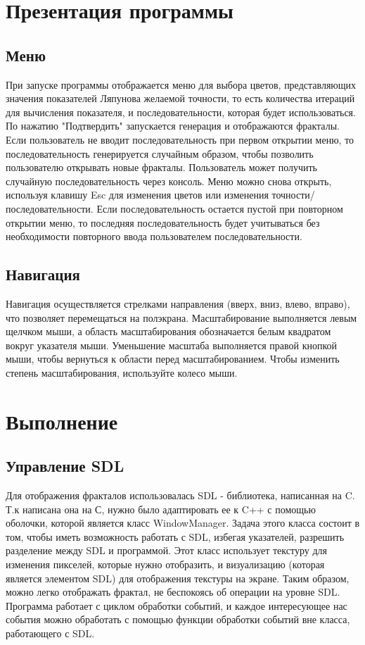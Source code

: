 \documentclass[a5paper,10pt, twoside]{article} %
\begin{document}
\section{Презентация программы}

  \subsection{Меню}

  При запуске программы отображается меню для выбора цветов, представляющих значения показателей Ляпунова
  желаемой точности, то есть количества итераций для вычисления показателя, и последовательности, которая будет использоваться.
  По нажатию "Подтвердить" запускается генерация и отображаются фракталы.
  Если пользователь не вводит последовательность при первом открытии меню, то последовательность генерируется случайным образом, 
  чтобы позволить пользователю открывать новые фракталы.
  Пользователь может получить случайную последовательность через консоль.
  Меню можно снова открыть, используя клавишу Esc для изменения цветов или изменения точности/последовательности.
  Если последовательность остается пустой при повторном открытии меню, то последняя последовательность будет учитываться 
  без необходимости повторного ввода пользователем последовательности.

  \subsection{Навигация}

  Навигация осуществляется стрелками направления (вверх, вниз, влево, вправо), что позволяет перемещаться на полэкрана.
  Масштабирование выполняется левым щелчком мыши, а область масштабирования обозначается белым квадратом вокруг указателя мыши.
  Уменьшение масштаба выполняется правой кнопкой мыши, чтобы вернуться к области перед масштабированием.
  Чтобы изменить степень масштабирования, используйте колесо мыши.

\section{Выполнение}
  
  \subsection{Управление SDL}

  Для отображения фракталов использовалась SDL - библиотека, написанная на C. Т.к написана она на С, нужно было 
  адаптировать ее к C++ с помощью оболочки, которой является класс WindowManager.
  Задача этого класса состоит в том, чтобы иметь возможность работать с SDL, избегая указателей,
   разрешить разделение между SDL и программой.
  Этот класс использует текстуру для изменения пикселей, которые нужно отобразить, и визуализацию 
  (которая является элементом SDL) для отображения текстуры на экране.
  Таким образом, можно легко отображать фрактал, не беспокоясь об операции на уровне SDL.
  Программа работает с циклом обработки событий, и каждое интересующее нас события 
  можно обработать с помощью функции обработки событий вне класса, работающего с SDL.
\end{document}

